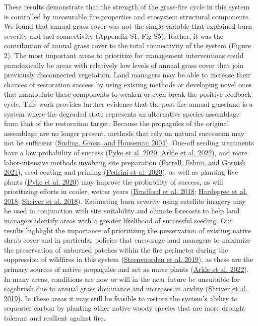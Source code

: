 \documentclass[
  12pt,
]{article}
\begin{document}
These results demonstrate that the strength of the grass-fire cycle in
this system is controlled by measurable fire properties and ecosystem
structural components. We found that annual grass cover was not the
single variable that explained burn severity and fuel connectivity
(Appendix S1, Fig S5). Rather, it was the contribution of annual grass
cover to the total connectivity of the system (Figure 2). The most
important areas to prioritize for management interventions could
paradoxically be areas with relatively low levels of annual grass cover
that join previously disconnected vegetation. Land managers may be able
to increase their chances of restoration success by using existing
methods or developing novel ones that manipulate these components to
weaken or even break the positive feedback cycle. This work provides
further evidence that the post-fire annual grassland is a system where
the degraded state represents an alternative species assemblage from
that of the restoration target. Because the propagules of the original
assemblage are no longer present, methods that rely on natural
succession may not be sufficient
(\protect\hyperlink{ref-Suding2004}{Suding, Gross, and Houseman 2004}).
One-off seeding treatments have a low probability of success
(\protect\hyperlink{ref-Pyke2020}{Pyke et al. 2020};
\protect\hyperlink{ref-Arkle2022}{Arkle et al. 2022}), and more
labor-intensive methods involving site preparation
(\protect\hyperlink{ref-Farrell2021}{Farrell, Fehmi, and Gornish 2021}),
seed coating and priming (\protect\hyperlink{ref-Pedrini2020}{Pedrini et
al. 2020}), as well as planting live plants
(\protect\hyperlink{ref-Pyke2020}{Pyke et al. 2020}) may improve the
probability of success, as will prioritizing efforts in cooler, wetter
years (\protect\hyperlink{ref-Bradford2018}{Bradford et al. 2018};
\protect\hyperlink{ref-Hardegree2018}{Hardegree et al. 2018};
\protect\hyperlink{ref-Shriver2018}{Shriver et al. 2018}). Estimating
burn severity using satellite imagery may be used in conjunction with
site suitability and climate forecasts to help land managers identify
areas with a greater likelihood of successful seeding. Our results
highlight the importance of prioritizing the preservation of existing
native shrub cover and in particular policies that encourage land
managers to maximize the preservation of unburned patches within the
fire perimeter during the suppression of wildfires in this system
(\protect\hyperlink{ref-Steenvoorden2019}{Steenvoorden et al. 2019}), as
these are the primary sources of native propagules and act as nurse
plants (\protect\hyperlink{ref-Arkle2022}{Arkle et al. 2022}). In many
areas, conditions are now or will in the near future be unsuitable for
sagebrush due to annual grass dominance and increases in aridity
(\protect\hyperlink{ref-Shriver2019}{Shriver et al. 2019}). In these
areas it may still be feasible to restore the system's ability to
sequester carbon by planting other native woody species that are more
drought tolerant and resilient against fire.
\end{document}
